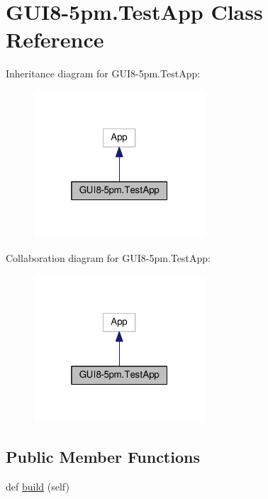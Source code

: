 \hypertarget{classGUI8-5pm_1_1TestApp}{}\section{G\+U\+I8-\/5pm.Test\+App Class Reference}
\label{classGUI8-5pm_1_1TestApp}


Inheritance diagram for G\+U\+I8-\/5pm.Test\+App\+:\nopagebreak
\begin{figure}[H]
\begin{center}
\leavevmode
\includegraphics[width=181pt]{classGUI8-5pm_1_1TestApp__inherit__graph}
\end{center}
\end{figure}


Collaboration diagram for G\+U\+I8-\/5pm.Test\+App\+:\nopagebreak
\begin{figure}[H]
\begin{center}
\leavevmode
\includegraphics[width=181pt]{classGUI8-5pm_1_1TestApp__coll__graph}
\end{center}
\end{figure}
\subsection*{Public Member Functions}
\begin{DoxyCompactItemize}
\item 
def \hyperlink{classGUI8-5pm_1_1TestApp_af577f679db75d0915d6dc2a9bd312852}{build} (self)
\end{DoxyCompactItemize}
